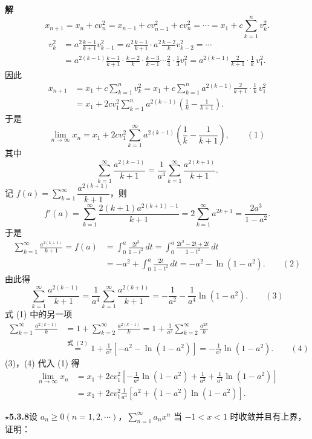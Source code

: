 \documentclass[UTF8,12pt,a4paper,fontset=fandol]{ctexart}
\begin{document}
\noindent\textbf{解}\quad
\[
  x_{n+1}=x_n+cv_n^2=x_{n-1}+cv_{n-1}^2+cv_n^2
  =\cdots=x_1+c\sum_{k=1}^n v_k^2.
\]
\[
\begin{aligned}
v_k^2
&=a^2\frac{k-1}{k+1}v_{k-1}^2
=a^2\frac{k-1}{k+1}\cdot a^2\frac{k-2}{k}v_{k-2}^2=\cdots\\
&=a^{2(k-1)}\frac{k-1}{k+1}\cdot\frac{k-2}{k}\cdot\frac{k-3}{k-1}\cdots\frac2{4}\cdot\frac1{3}v_1^2
=a^{2(k-1)}\frac2{k+1}\cdot\frac1k\,v_1^2.
\end{aligned}
\]
因此
\[
\begin{aligned}
x_{n+1}
&=x_1+c\sum_{k=1}^n v_k^2
=x_1+c\sum_{k=1}^n a^{2(k-1)}\frac2{k+1}\cdot\frac1k\,v_1^2\\
&=x_1+2cv_1^2\sum_{k=1}^n a^{2(k-1)}\left(\frac1k-\frac1{k+1}\right).
\end{aligned}
\]
于是
\[
  \lim_{n\to\infty}x_n
  =x_1+2cv_1^2\sum_{k=1}^{\infty}a^{2(k-1)}
  \left(\frac1k-\frac1{k+1}\right), \qquad(1)
\]
其中
\[
  \sum_{k=1}^{\infty}\frac{a^{2(k-1)}}{k+1}
  =\frac1{a^4}\sum_{k=1}^{\infty}\frac{a^{2(k+1)}}{k+1}.
\]
记 $f(a)=\displaystyle\sum_{k=1}^{\infty}\dfrac{a^{2(k+1)}}{k+1}$，则
\[
  f'(a)=\sum_{k=1}^{\infty}\frac{2(k+1)a^{2(k+1)-1}}{k+1}
  =2\sum_{k=1}^{\infty}a^{2k+1}
  =\frac{2a^3}{1-a^2}.
\]
于是
\[
\begin{aligned}
  \sum_{k=1}^{\infty}\frac{a^{2(k+1)}}{k+1}
  =f(a)
  &=\int_0^a\frac{2t^3}{1-t^2}\,dt
  =\int_0^a\frac{2t^3-2t+2t}{1-t^2}\,dt\\
  &=-a^2+\int_0^a\frac{2t}{1-t^2}\,dt
  =-a^2-\ln(1-a^2). \qquad(2)
\end{aligned}
\]
由此得
\[
  \sum_{k=1}^{\infty}\frac{a^{2(k-1)}}{k+1}
  =\frac1{a^4}\sum_{k=1}^{\infty}\frac{a^{2(k+1)}}{k+1}
  =-\frac1{a^2}-\frac1{a^4}\ln(1-a^2). \qquad(3)
\]
式 (1) 中的另一项
\[
\begin{aligned}
  \sum_{k=1}^{\infty}\frac{a^{2(k-1)}}k
  &=1+\sum_{k=2}^{\infty}\frac{a^{2(k-1)}}k
  =1+\frac1{a^2}\sum_{k=2}^{\infty}\frac{a^{2k}}k\\
  &\overset{\text{式 }(2)}{=}1+\frac1{a^2}\left[-a^2-\ln(1-a^2)\right]
  =-\frac1{a^2}\ln(1-a^2). \qquad(4)
\end{aligned}
\]
(3)，(4) 代入 (1) 得
\[
\begin{aligned}
  \lim_{n\to\infty}x_n
  &=x_1+2cv_1^2\left[-\frac1{a^2}\ln(1-a^2)+\frac1{a^2}
  +\frac1{a^4}\ln(1-a^2)\right]\\
  &=x_1+2cv_1^2\frac1{a^4}\left[a^2+(1-a^2)\ln(1-a^2)\right].
\end{aligned}
\]

\noindent\textbf{\(\star\)5.3.8}\quad 设 $a_n\ge0(n=1,2,\cdots)$，$\displaystyle\sum_{n=1}^{\infty}a_nx^n$ 当 $-1<x<1$ 时收敛并且有上界，证明：
\end{document}
